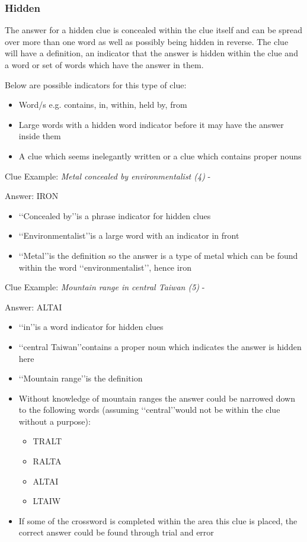 \subsubsection{Hidden} 
The answer for a hidden clue is concealed within the clue itself and can be spread over more than one word as well as possibly being hidden in reverse. The clue will have a definition, an indicator that the answer is hidden within the clue and a word or set of words which have the answer in them.  

Below are possible indicators for this type of clue:
\begin{itemize} 
	\item Word/s e.g. contains, in, within, held by, from 
	\item Large words with a hidden word indicator before it may have the answer inside them 
	\item A clue which seems inelegantly written or a clue which contains proper nouns  
\\
\end{itemize}

Clue Example: \emph{Metal concealed by environmentalist (4)} - \citep{shuchiHidden08}

Answer: IRON 

\begin{itemize}
	\item \lq\lq Concealed by\rq\rq is a phrase indicator for hidden clues 
	\item \lq\lq Environmentalist\rq\rq is a large word with an indicator in front 
	\item \lq\lq Metal\rq\rq is the definition so the answer is a type of metal which can be found within the word \lq\lq environmentalist\rq\rq, hence iron 
\\
\end{itemize}

Clue Example: \emph{Mountain range in central Taiwan (5)} - \citep{shuchiHidden08}

Answer: ALTAI 

\begin{itemize}
	\item \lq\lq in\rq\rq is a word indicator for hidden clues 
	\item \lq\lq central Taiwan\rq\rq contains a proper noun which indicates the answer is hidden here 
 	\item \lq\lq Mountain range\rq\rq is the definition 
 	\item Without knowledge of mountain ranges the answer could be narrowed down to the following words (assuming \lq\lq central\rq\rq would not be within the clue without a purpose): 
	\begin{itemize}
		\item TRALT 
		\item RALTA 
		\item ALTAI 
		\item LTAIW
	\end{itemize} 
\item If some of the crossword is completed within the area this clue is placed, the correct answer could be found through trial and error 
\end{itemize}

